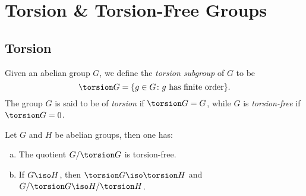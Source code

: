 \section{Torsion \& Torsion-Free Groups}

\subsection{Torsion}

\begin{definition}
    \label{def:torsion-subgroup}
    Given an abelian group \(G\), we define the \emph{torsion subgroup} of \(G\) to be
    \[
        \torsion G = \{g \in G \colon g \text{ has finite order}\}.
    \]
    The group \(G\) is said to be of \emph{torsion} if \(\torsion G = G\), while
    \(G\) is \emph{torsion-free} if \(\torsion G = 0\).
\end{definition}

\begin{corollary}
    \label{cor:torsion-subgrp-first-properties}
    Let \(G\) and \(H\) be abelian groups, then one has:
    \begin{enumerate}[(a)]\setlength\itemsep{0em}
        \item The quotient \(G/\torsion G\) is torsion-free.
        \item If \(G \iso H\), then \(\torsion G \iso \torsion H\) and
              \(G/\torsion G \iso H/\torsion H\).
    \end{enumerate}
\end{corollary}

